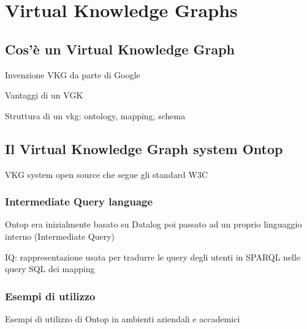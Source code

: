 \chapter{Virtual Knowledge Graphs}
\label{cha:vkg}

\section{Cos'è un Virtual Knowledge Graph}
\label{sec:vkg_description}
Invenzione VKG da parte di Google

Vantaggi di un VGK

Struttura di un vkg: ontology, mapping, schema

\section{Il Virtual Knowledge Graph system Ontop}
\label{sec:vkg_ontop}
VKG system open source che segue gli standard W3C 

\subsection{Intermediate Query language}
Ontop era inizialmente basato su Datalog poi passato ad un proprio linguaggio interno (Intermediate Query)

IQ: rappresentazione usata per tradurre le query degli utenti in SPARQL nelle query SQL dei mapping

\subsection{Esempi di utilizzo}
Esempi di utilizzo di Ontop in ambienti aziendali e accademici


